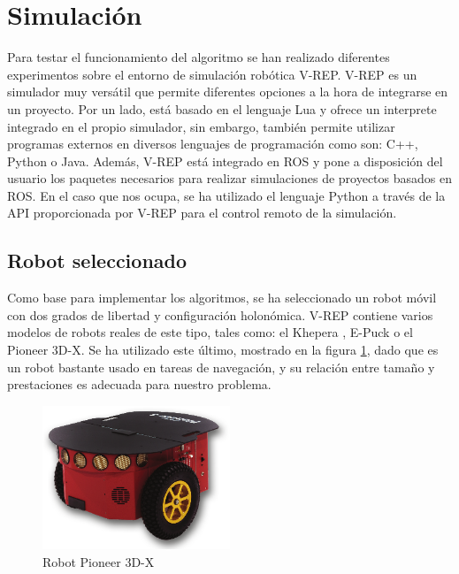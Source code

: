 \section{Simulación}
\label{simulacion}

Para testar el funcionamiento del algoritmo se han realizado diferentes experimentos sobre el entorno de simulación robótica V-REP. V-REP es un simulador muy versátil que permite diferentes opciones a la hora de integrarse en un proyecto. Por un lado, está basado en el lenguaje Lua y ofrece un interprete integrado en el propio simulador, sin embargo, también permite utilizar programas externos en diversos lenguajes de programación como son: C++, Python o Java. Además, V-REP está integrado en ROS y pone a disposición del usuario los paquetes necesarios para realizar simulaciones de proyectos basados en ROS. En el caso que nos ocupa, se ha utilizado el lenguaje Python a través de la API proporcionada por V-REP para el control remoto de la simulación.\\

\subsection{Robot seleccionado}

Como base para implementar los algoritmos, se ha seleccionado un robot móvil con dos grados de libertad y configuración holonómica. V-REP contiene varios modelos de robots reales de este tipo, tales como: el Khepera , E-Puck o el Pioneer 3D-X. Se ha utilizado este último, mostrado en la figura \ref{fig:pioneer}, dado que es un robot bastante usado en tareas de navegación, y su relación entre tamaño y prestaciones es adecuada para nuestro problema.

\begin{figure}[h]
		\centering
        \includegraphics[width=0.5\textwidth]{images/pioneer.png}
        \caption{Robot Pioneer 3D-X}
        \label{fig:pioneer}
\end{figure} 

